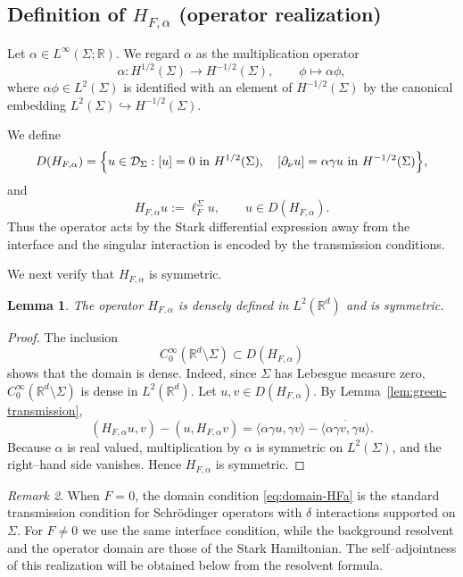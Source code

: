 \documentclass[a4paper,11pt]{article}
\numberwithin{equation}{section}
\newtheorem{lem}{Lemma}[section]
\theoremstyle{remark}
\newtheorem{rem}[lem]{Remark}
\theoremstyle{definition}
\theoremstyle{remark}
\begin{document}
\subsection{Definition of $H_{F,\alpha}$ (operator realization)}

Let $\alpha\in L^\infty(\Sigma;\mathbb R)$.
We regard $\alpha$ as the multiplication operator
$$
\alpha:H^{1/2}(\Sigma)\to H^{-1/2}(\Sigma),
\qquad \phi\mapsto\alpha\phi,
$$
where $\alpha\phi\in L^2(\Sigma)$ is identified with an element of $H^{-1/2}(\Sigma)$ by the canonical embedding $L^2(\Sigma)\hookrightarrow H^{-1/2}(\Sigma)$.

We define
\begin{equation}\label{eq:domain-HFa}
D(H_{F,\alpha})
=
\Bigl\{u\in\mathcal D_\Sigma:
[u]=0\text{ in }H^{1/2}(\Sigma),\quad
[\partial_\nu u]=\alpha\gamma u
\text{ in }H^{-1/2}(\Sigma)
\Bigr\},
\end{equation}
and
$$
H_{F,\alpha}u:=\ell_F^\Sigma u,
\qquad u\in D(H_{F,\alpha}).
$$
Thus the operator acts by the Stark differential expression away from the interface and the singular interaction is encoded by the transmission conditions.

We next verify that $H_{F,\alpha}$ is symmetric.

\begin{lem}\label{lem:symmetric-HFa}
The operator $H_{F,\alpha}$ is densely defined in $L^2(\mathbb R^d)$ and is symmetric.
\end{lem}

\begin{proof}
The inclusion
$$
C_0^\infty(\mathbb R^d\setminus\Sigma)
\subset D(H_{F,\alpha})
$$
shows that the domain is dense.
Indeed, since $\Sigma$ has Lebesgue measure zero, $C_0^\infty(\mathbb R^d\setminus\Sigma)$ is dense in $L^2(\mathbb R^d)$.
Let $u,v\in D(H_{F,\alpha})$.
By Lemma~\ref{lem:green-transmission},
$$
(H_{F,\alpha}u,v)-(u,H_{F,\alpha}v)
=
\langle\alpha\gamma u,\gamma v\rangle
-\overline{\langle\alpha\gamma v,\gamma u\rangle}.
$$
Because $\alpha$ is real valued, multiplication by $\alpha$ is symmetric on $L^2(\Sigma)$, and the right--hand side vanishes.
Hence $H_{F,\alpha}$ is symmetric.
\end{proof}

\begin{rem}
When $F=0$, the domain condition \eqref{eq:domain-HFa} is the standard transmission condition for Schr\"odinger operators with $\delta$ interactions supported on $\Sigma$.
For $F\ne0$ we use the same interface condition, while the background resolvent and the operator domain are those of the Stark Hamiltonian.
The self--adjointness of this realization will be obtained below from the resolvent formula.
\end{rem}
\end{document}
